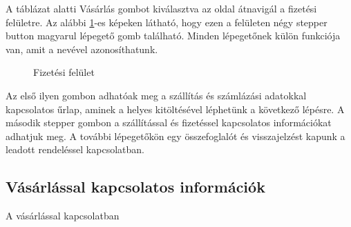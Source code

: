\bigskip
A táblázat alatti Vásárlás gombot kiválasztva az oldal átnavigál a fizetési felületre. Az alábbi \ref{fig.exemple-10}-es képeken látható, hogy ezen a felületen négy stepper button magyarul lépegető gomb található. Minden lépegetőnek külön funkciója van, amit a nevével azonosíthatunk.
\begin{figure}[H]
	\centering
	\hspace{5pt}
	\caption{Fizetési felület}
	\label{fig.exemple-10}
\end{figure}

Az első ilyen gombon adhatóak meg a szállítás és számlázási adatokkal kapcsolatos űrlap, aminek a helyes kitöltésével léphetünk a következő lépésre. A második stepper gombon a szállítással és fizetéssel kapcsolatos információkat adhatjuk meg. A további lépegetőkön egy összefoglalót és visszajelzést kapunk a leadott rendeléssel kapcsolatban.

\subsection{Vásárlással kapcsolatos információk}
A vásárlással kapcsolatban 